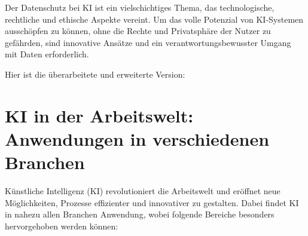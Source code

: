 \documentclass[a4paper,12pt]{article}
\begin{document}
Der Datenschutz bei KI ist ein vielschichtiges Thema, das technologische, rechtliche und ethische Aspekte vereint. Um das volle Potenzial von KI-Systemen ausschöpfen zu können, ohne die Rechte und Privatsphäre der Nutzer zu gefährden, sind innovative Ansätze und ein verantwortungsbewusster Umgang mit Daten erforderlich.



Hier ist die überarbeitete und erweiterte Version:

\section{KI in der Arbeitswelt: Anwendungen in verschiedenen Branchen}

Künstliche Intelligenz (KI) revolutioniert die Arbeitswelt und eröffnet neue Möglichkeiten, Prozesse effizienter und innovativer zu gestalten. Dabei findet KI in nahezu allen Branchen Anwendung, wobei folgende Bereiche besonders hervorgehoben werden können:
\end{document}
